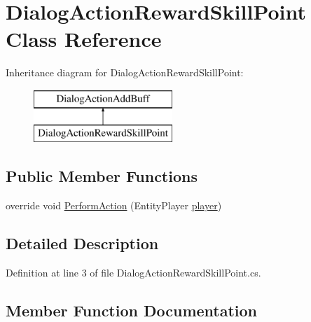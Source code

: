 \hypertarget{class_dialog_action_reward_skill_point}{}\section{Dialog\+Action\+Reward\+Skill\+Point Class Reference}
\label{class_dialog_action_reward_skill_point}
Inheritance diagram for Dialog\+Action\+Reward\+Skill\+Point\+:\begin{figure}[H]
\begin{center}
\leavevmode
\includegraphics[height=2.000000cm]{class_dialog_action_reward_skill_point}
\end{center}
\end{figure}
\subsection*{Public Member Functions}
\begin{DoxyCompactItemize}
\item 
override void \mbox{\hyperlink{class_dialog_action_reward_skill_point_a36938e31a21c430b2cd14866a1ebe95f}{Perform\+Action}} (Entity\+Player \mbox{\hyperlink{_sphere_i_i_01_music_01_boxes_2_config_2_localization_8txt_a4e2cb8aeff651600ea1cc57fe5a929a4}{player}})
\end{DoxyCompactItemize}


\subsection{Detailed Description}


Definition at line 3 of file Dialog\+Action\+Reward\+Skill\+Point.\+cs.



\subsection{Member Function Documentation}
\mbox{\label{class_dialog_action_reward_skill_point_a36938e31a21c430b2cd14866a1ebe95f}} 
